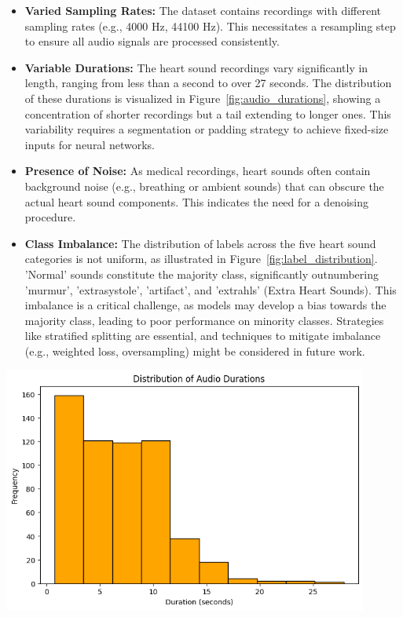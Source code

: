 \documentclass[a4paper]{article}
\begin{document}
\begin{multicols}{2}
\begin{itemize}
    \item \textbf{Varied Sampling Rates:} The dataset contains recordings with different sampling rates (e.g., 4000 Hz, 44100 Hz). This necessitates a resampling step to ensure all audio signals are processed consistently.
    \item \textbf{Variable Durations:} The heart sound recordings vary significantly in length, ranging from less than a second to over 27 seconds. The distribution of these durations is visualized in Figure~\ref{fig:audio_durations}, showing a concentration of shorter recordings but a tail extending to longer ones. This variability requires a segmentation or padding strategy to achieve fixed-size inputs for neural networks.
    \item \textbf{Presence of Noise:} As medical recordings, heart sounds often contain background noise (e.g., breathing or ambient sounds)  that can obscure the actual heart sound components. This indicates the need for a denoising procedure.
    \item \textbf{Class Imbalance:} The distribution of labels across the five heart sound categories is not uniform, as illustrated in Figure~\ref{fig:label_distribution}. 'Normal' sounds constitute the majority class, significantly outnumbering 'murmur', 'extrasystole', 'artifact', and 'extrahls' (Extra Heart Sounds). This imbalance is a critical challenge, as models may develop a bias towards the majority class, leading to poor performance on minority classes. Strategies like stratified splitting are essential, and techniques to mitigate imbalance (e.g., weighted loss, oversampling) might be considered in future work.
\end{itemize}

\begin{minipage}{\columnwidth}
    \centering
    \includegraphics[width=0.9\textwidth]{output-3.png}
    \label{fig:audio_durations}
\end{minipage}


\end{multicols}
\end{document}
